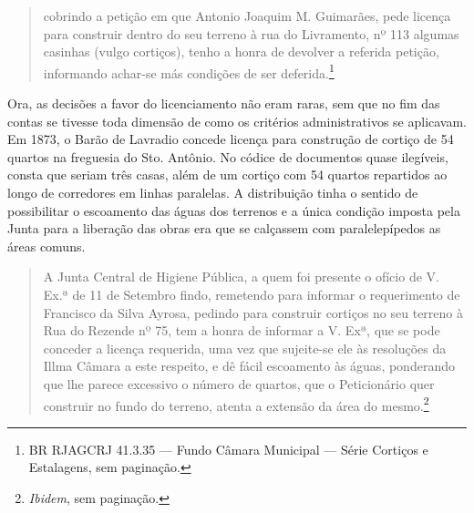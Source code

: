\begin{quote}
cobrindo a petição em que Antonio Joaquim M. Guimarães, pede licença
para construir dentro do seu terreno à rua do Livramento, nº 113 algumas
casinhas (vulgo cortiços), tenho a honra de devolver a referida petição,
informando achar-se más condições de ser deferida.\footnote{BR RJAGCRJ
  41.3.35 --- Fundo Câmara Municipal --- Série Cortiços e Estalagens, sem
  paginação.}
\end{quote}

Ora, as decisões a favor do licenciamento não eram raras, sem que no fim
das contas se tivesse toda dimensão de como os critérios administrativos
se aplicavam. Em 1873, o Barão de Lavradio concede licença para
construção de cortiço de 54 quartos na freguesia do Sto. Antônio. No
códice de documentos quase ilegíveis, consta que seriam três casas, além
de um cortiço com 54 quartos repartidos ao longo de corredores em linhas
paralelas. A distribuição tinha o sentido de possibilitar o escoamento
das águas dos terrenos e a única condição imposta pela Junta para a
liberação das obras era que se calçassem com paralelepípedos as áreas
comuns.

\begin{quote}
A Junta Central de Higiene Pública, a quem foi presente o ofício de V.
Ex.ª de 11 de Setembro findo, remetendo para informar o requerimento de
Francisco da Silva Ayrosa, pedindo para construir cortiços no seu
terreno à Rua do Rezende nº 75, tem a honra de informar a V. Exª, que se
pode conceder a licença requerida, uma vez que sujeite-se ele às
resoluções da Illma Câmara a este respeito, e dê fácil escoamento às
águas, ponderando que lhe parece excessivo o número de quartos, que o
Peticionário quer construir no fundo do terreno, atenta a extensão da
área do mesmo.\footnote{\textit{Ibidem}, sem paginação.}
\end{quote}


